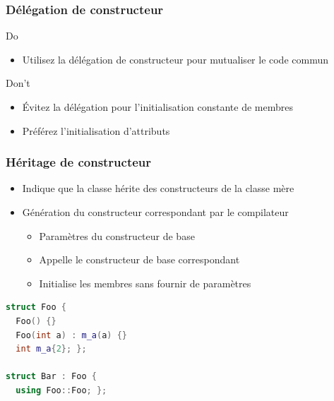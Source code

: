 \documentclass[C++.tex]{subfiles}
\begin{document}
\begin{frame}[fragile]
	\frametitle{Délégation de constructeur}
	\begin{exampleblock}{Do}
		\begin{itemize}
			\item Utilisez la délégation de constructeur pour mutualiser le code commun
		\end{itemize}

	\end{exampleblock}

	\begin{alertblock}{Don't}
		\begin{itemize}
			\item Évitez la délégation pour l'initialisation constante de membres
			\item Préférez l'initialisation d'attributs
		\end{itemize}
	\end{alertblock}
\end{frame}

\begin{frame}[fragile]
	\frametitle{Héritage de constructeur}
	\begin{itemize}
		\item Indique que la classe hérite des constructeurs de la classe mère
		\item Génération du constructeur correspondant par le compilateur
		\begin{itemize}
			\item Paramètres du constructeur de base
			\item Appelle le constructeur de base correspondant
			\item Initialise les membres sans fournir de paramètres

		\end{itemize}
	\end{itemize}

	\begin{lstlisting}[language=C++]
struct Foo {
  Foo() {}
  Foo(int a) : m_a(a) {}
  int m_a{2}; };

struct Bar : Foo {
  using Foo::Foo; };\end{lstlisting}
\end{frame}
\end{document}

